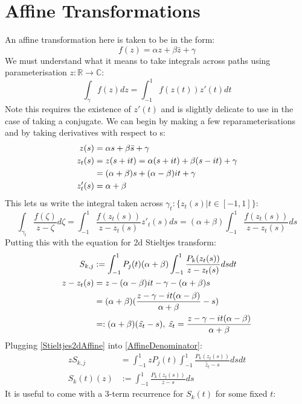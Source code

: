 \documentclass{article}
\begin{document}
\section{Affine Transformations}
An affine transformation here is taken to be in the form:
$$f(z) = \alpha z + \beta \bar{z} + \gamma$$
We must understand what it means to take integrals across paths using parameterisation $z: \mathbb{R}\rightarrow\mathbb{C}$:
$$\int_\gamma f(z)dz = \int_{-1}^1f(z(t))z'(t)dt$$
Note this requires the existence of $z'(t)$ and is slightly delicate to use in the case of taking a conjugate.
We can begin by making a few reparameterisations and by taking derivatives with respect to s:
\begin{align}
z(s) &= \alpha s + \beta\bar{s} + \gamma \notag\\
z_t(s) &= z(s+it) = \alpha(s+it)+\beta(s-it)+\gamma \notag\\
&= (\alpha+\beta)s+(\alpha-\beta)it+\gamma
\label{ZtExpansion}\\
z'_t(s) &= \alpha+\beta \notag
\end{align}
This lets us write the integral taken across $\gamma_t:\{z_t(s)|t\in [-1,1]\}$:
$$\int_{\gamma_t} \frac{f(\zeta)}{z-\zeta}d\zeta
= \int_{-1}^1\frac{f(z_t(s))}{z-z_t(s)}z'_t(s)ds
= (\alpha+\beta)\int_{-1}^1\frac{f(z_t(s))}{z-z_t(s)}ds$$
Putting this with the equation for 2d Stieltjes transform:
\begin{align}\label{Stieltjes2dAffine}
S_{k,j} &:= \int_{-1}^1P_j(t)(\alpha+\beta)\int_{-1}^1\frac{P_k(z_t(s))}{z-z_t(s)}dsdt \\
z-z_t(s) &= z-(\alpha-\beta)it-\gamma-(\alpha+\beta)s \notag\\
&= (\alpha+\beta)(\frac{z-\gamma-it(\alpha-\beta)}{\alpha+\beta}-s) \notag\\
&=: (\alpha+\beta)(\tilde{z_t}-s), \:
\tilde{z_t} = \frac{z-\gamma-it(\alpha-\beta)}{\alpha+\beta}
\label{AffineDenominator}
\end{align}
Plugging \eqref{Stieltjes2dAffine} into \eqref{AffineDenominator}:
\begin{align}
zS_{k,j}&=\int_{-1}^1zP_j(t)\int_{-1}^1\frac{P_k(z_t(s))}{\tilde{z_t}-s}dsdt 
\label{NormedStieltjes2dAffine}\\
S_k(t)(z)&:=\int_{-1}^1\frac{P_k(z_t(s))}{z-s}ds
\label{1dAffine}
\end{align}
It is useful to come with a 3-term recurrence for $S_k(t)$ for some fixed $t$:
\end{document}
